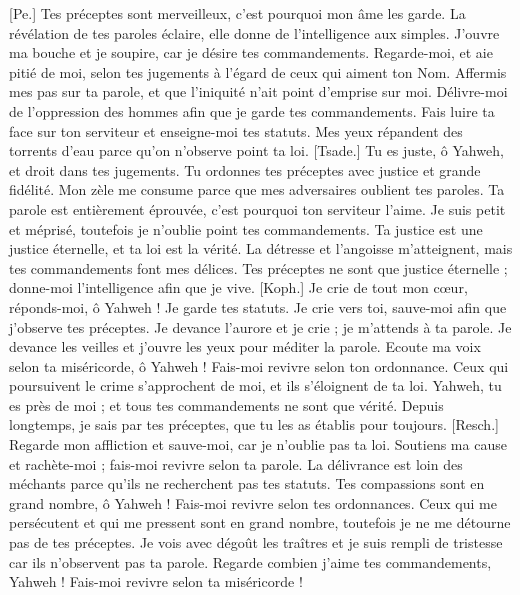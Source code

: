 \begin{multicols}{2}
[Pe.] Tes préceptes sont merveilleux, c'est pourquoi mon âme les garde.
La révélation de tes paroles éclaire, elle donne de l'intelligence aux simples.
J'ouvre ma bouche et je soupire, car je désire tes commandements.
Regarde-moi, et aie pitié de moi, selon tes jugements à l’égard de ceux qui aiment ton Nom.
Affermis mes pas sur ta parole, et que l'iniquité n'ait point d'emprise sur moi.
Délivre-moi de l'oppression des hommes afin que je garde tes commandements.
Fais luire ta face sur ton serviteur et enseigne-moi tes statuts.
Mes yeux répandent des torrents d'eau parce qu'on n'observe point ta loi.
[Tsade.] Tu es juste, ô Yahweh, et droit dans tes jugements.
Tu ordonnes tes préceptes avec justice et grande fidélité.
Mon zèle me consume parce que mes adversaires oublient tes paroles.
Ta parole est entièrement éprouvée, c'est pourquoi ton serviteur l'aime.
Je suis petit et méprisé, toutefois je n'oublie point tes commandements.
Ta justice est une justice éternelle, et ta loi est la vérité.
La détresse et l'angoisse m’atteignent, mais tes commandements font mes délices.
Tes préceptes ne sont que justice éternelle ; donne-moi l’intelligence afin que je vive.
[Koph.] Je crie de tout mon cœur, réponds-moi, ô Yahweh ! Je garde tes statuts.
Je crie vers toi, sauve-moi afin que j'observe tes préceptes.
Je devance l’aurore et je crie ; je m’attends à ta parole.
Je devance les veilles et j’ouvre les yeux pour méditer la parole.
Ecoute ma voix selon ta miséricorde, ô Yahweh ! Fais-moi revivre selon ton ordonnance.
Ceux qui poursuivent le crime s’approchent de moi, et ils s’éloignent de ta loi.
Yahweh, tu es près de moi ; et tous tes commandements ne sont que vérité.
Depuis longtemps, je sais par tes préceptes, que tu les as établis pour toujours.
[Resch.] Regarde mon affliction et sauve-moi, car je n'oublie pas ta loi.
Soutiens ma cause et rachète-moi ; fais-moi revivre selon ta parole.
La délivrance est loin des méchants parce qu'ils ne recherchent pas tes statuts.
Tes compassions sont en grand nombre, ô Yahweh ! Fais-moi revivre selon tes ordonnances.
Ceux qui me persécutent et qui me pressent sont en grand nombre, toutefois je ne me détourne pas de tes préceptes.
Je vois avec dégoût les traîtres et je suis rempli de tristesse car ils n'observent pas ta parole.
Regarde combien j'aime tes commandements, Yahweh ! Fais-moi revivre selon ta miséricorde !

\end{multicols}

